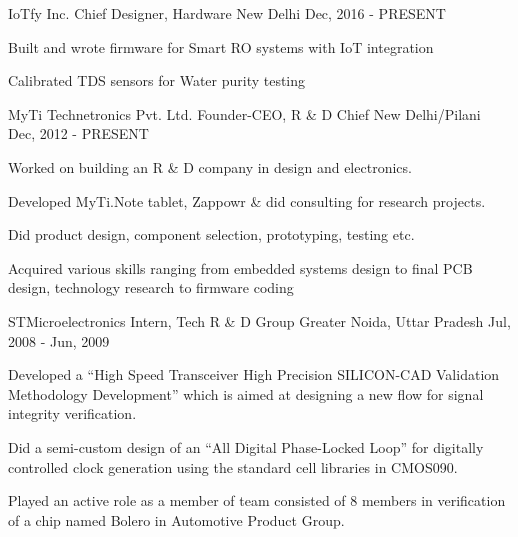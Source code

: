 

\begin{cventries}

\cventry
{IoTfy Inc.} %
{Chief Designer, Hardware} %
{New Delhi} %
{Dec, 2016 - PRESENT} %
{
	\begin{cvitems} %
		\item {Built and wrote firmware for Smart RO systems with IoT integration}
		\item {Calibrated TDS sensors for Water purity testing}
	\end{cvitems}
}

  \cventry
    {MyTi Technetronics Pvt. Ltd.} %
    {Founder-CEO, R \& D Chief} %
    {New Delhi/Pilani} %
    {Dec, 2012 - PRESENT} %
    {
      \begin{cvitems} %
        \item {Worked on building an R \& D company in design and electronics.}
        \item {Developed MyTi.Note tablet, Zappowr \& did consulting for research projects.}
        \item {Did product design, component selection, prototyping, testing etc.}
        \item {Acquired various skills ranging from embedded systems design to final PCB design, technology research to firmware coding}
      \end{cvitems}
    }

  \cventry
    {STMicroelectronics} %
    {Intern, Tech R \& D Group} %
    {Greater Noida, Uttar Pradesh} %
    {Jul, 2008 - Jun, 2009} %
    {
      \begin{cvitems} %
        \item {Developed a “High Speed Transceiver High Precision SILICON-CAD Validation Methodology Development” which is aimed at designing a new flow for signal integrity verification.}
        \item {Did a semi-custom design of an “All Digital Phase-Locked Loop” for digitally controlled clock generation using the standard cell libraries in CMOS090.}
        \item {Played an active role as a member of team consisted of 8 members in verification of a chip named Bolero in Automotive Product Group.}
      \end{cvitems}
    }

\end{cventries}
